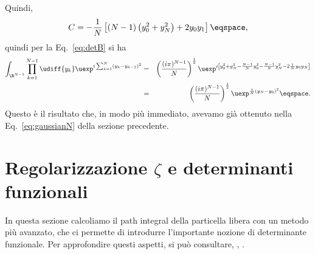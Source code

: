 Quindi,
\begin{displaymath}
C = - \frac{1}{N} \left[ (N-1 ) \left( y_{0}^{2} + y_{N}^{2} \right) + 2  y_{0}
y_{1} \right]  \eqspace ,
\end{displaymath}
quindi per la Eq.~\eqref{eq:detB} si  ha
\begin{eqnarray*}
\int_{\R^{N-1}} \prod_{k=1}^{N-1} 
\udiff{y_{k}} \uexp^{i \sum_{k=1}^{N} \left( y_{k} - y_{k-1} \right)^{2}} &=& 
\left( \frac{(i\pi)^{N-1}}{N} \right)^{\frac{1}{2}} \uexp^{ i \left[ y_{0}^{2} +
y_{N}^{2} - \frac{N-1}{N} y_{0}^{2} - \frac{N-1}{N} y_{N}^{2} - 2 \frac{1}{N}
y_{0} y_{N} \right]} \\
&=&
\left( \frac{(i\pi)^{N-1}}{N} \right)^{\frac{1}{2} } 
\uexp^{ \frac{i}{N} \left( y_{N} - y_{0}\right)^{2} } \eqspace .
\end{eqnarray*}
Questo \`e il risultato che, in modo pi\`u immediato, avevamo gi\`a ottenuto
nella Eq.~\eqref{eq:gaussianN} della sezione precedente.
\section{Regolarizzazione $\zeta$ e determinanti funzionali}
In questa sezione calcoliamo il path integral della particella libera con un
metodo pi\`u avanzato, che ci permette di introdurre l'importante nozione di determinante
funzionale. 
Per approfondire questi aspetti, si pu\`o consultare, \eg, \citet{steiner}.

